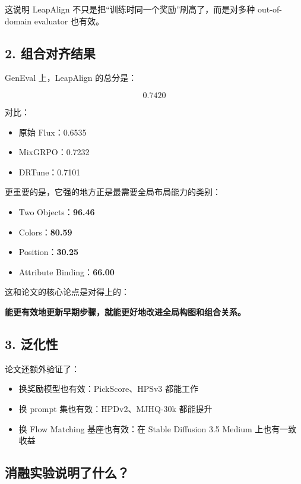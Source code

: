 这说明 LeapAlign 不只是把“训练时同一个奖励”刷高了，而是对多种 out-of-domain evaluator 也有效。

\subsection{2. 组合对齐结果}

GenEval 上，LeapAlign 的总分是：

\[
0.7420
\]

对比：

\begin{itemize}[leftmargin=1.5em]
  \item 原始 Flux：0.6535
  \item MixGRPO：0.7232
  \item DRTune：0.7101
\end{itemize}

更重要的是，它强的地方正是最需要全局布局能力的类别：

\begin{itemize}[leftmargin=1.5em]
  \item Two Objects：\textbf{96.46}
  \item Colors：\textbf{80.59}
  \item Position：\textbf{30.25}
  \item Attribute Binding：\textbf{66.00}
\end{itemize}

这和论文的核心论点是对得上的：

\textbf{能更有效地更新早期步骤，就能更好地改进全局构图和组合关系。}

\subsection{3. 泛化性}

论文还额外验证了：

\begin{itemize}[leftmargin=1.5em]
  \item 换奖励模型也有效：PickScore、HPSv3 都能工作
  \item 换 prompt 集也有效：HPDv2、MJHQ-30k 都能提升
  \item 换 Flow Matching 基座也有效：在 Stable Diffusion 3.5 Medium 上也有一致收益
\end{itemize}

\subsection{消融实验说明了什么？}


